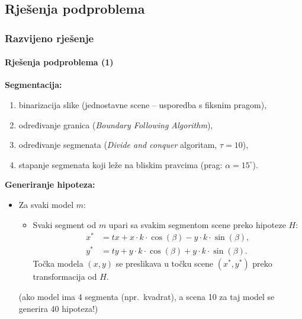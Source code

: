 \documentclass{beamer}
\begin{document}
\subsection{Rješenja podproblema}
\begin{frame}
\frametitle{Razvijeno rješenje}
\framesubtitle{Rješenja podproblema (1)}
\textbf{Segmentacija:}
\begin{enumerate}
  \item binarizacija slike (jednostavne scene -- usporedba s fiksnim pragom),
  \item određivanje granica (\emph{Boundary Following Algorithm}),
  \item određivanje segmenata (\emph{Divide and conquer} algoritam, $\tau = 10$),
  \item stapanje segmenata koji leže na bliskim pravcima (prag: $\alpha = 15^\circ$).
\end{enumerate}
\pause
\textbf{Generiranje hipoteza:}
\begin{itemize}
  \item Za svaki model $m$:
  \begin{itemize}
    \item Svaki segment od $m$ upari sa svakim segmentom scene preko hipoteze $H$:
    \begin{align*}
      x^{\ast} & = tx + x\cdot k\cdot \cos(\beta) - y\cdot k\cdot \sin(\beta), \\
      y^{\ast} & = ty + y\cdot k\cdot \cos(\beta) + y\cdot k\cdot \sin(\beta).
    \end{align*}
    Točka modela $(x, y)$ se preslikava u točku scene $(x^{\ast}, y^{\ast})$ preko
    transformacija od $H$.
  \end{itemize}
  \pause
  (ako model ima 4 segmenta (npr.\ kvadrat), a scena 10 za taj model se generira 40 hipoteza!)
\end{itemize}
\end{frame}
\end{document}
